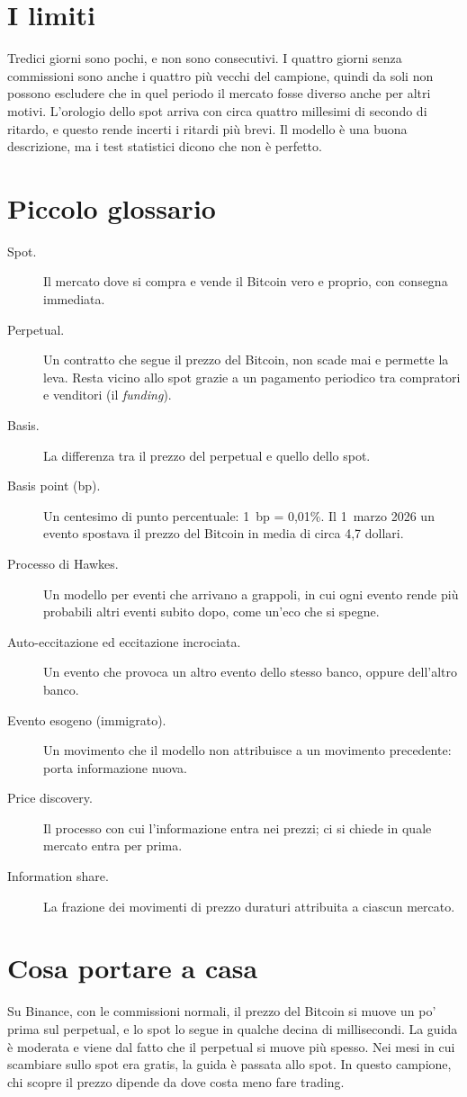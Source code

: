 \documentclass[a4paper,11pt]{article}
\begin{document}
\section*{I limiti}

Tredici giorni sono pochi, e non sono consecutivi. I quattro giorni senza commissioni sono anche i quattro più vecchi del campione, quindi da soli non possono escludere che in quel periodo il mercato fosse diverso anche per altri motivi. L'orologio dello spot arriva con circa quattro millesimi di secondo di ritardo, e questo rende incerti i ritardi più brevi. Il modello è una buona descrizione, ma i test statistici dicono che non è perfetto.

\section*{Piccolo glossario}

\begin{description}
\item[Spot.] Il mercato dove si compra e vende il Bitcoin vero e proprio, con consegna immediata.
\item[Perpetual.] Un contratto che segue il prezzo del Bitcoin, non scade mai e permette la leva. Resta vicino allo spot grazie a un pagamento periodico tra compratori e venditori (il \emph{funding}).
\item[Basis.] La differenza tra il prezzo del perpetual e quello dello spot.
\item[Basis point (bp).] Un centesimo di punto percentuale: 1~bp = 0,01\%. Il 1~marzo 2026 un evento spostava il prezzo del Bitcoin in media di circa 4,7 dollari.
\item[Processo di Hawkes.] Un modello per eventi che arrivano a grappoli, in cui ogni evento rende più probabili altri eventi subito dopo, come un'eco che si spegne.
\item[Auto-eccitazione ed eccitazione incrociata.] Un evento che provoca un altro evento dello stesso banco, oppure dell'altro banco.
\item[Evento esogeno (immigrato).] Un movimento che il modello non attribuisce a un movimento precedente: porta informazione nuova.
\item[Price discovery.] Il processo con cui l'informazione entra nei prezzi; ci si chiede in quale mercato entra per prima.
\item[Information share.] La frazione dei movimenti di prezzo duraturi attribuita a ciascun mercato.
\end{description}

\section*{Cosa portare a casa}

Su Binance, con le commissioni normali, il prezzo del Bitcoin si muove un po' prima sul perpetual, e lo spot lo segue in qualche decina di millisecondi. La guida è moderata e viene dal fatto che il perpetual si muove più spesso. Nei mesi in cui scambiare sullo spot era gratis, la guida è passata allo spot. In questo campione, chi scopre il prezzo dipende da dove costa meno fare trading.
\end{document}
